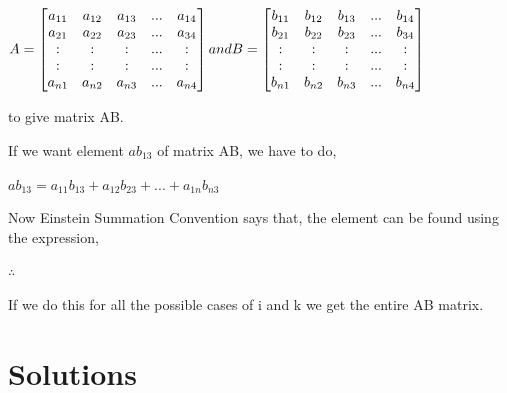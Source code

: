 \documentclass[a4paper,12pt]{article}
\begin{document}
\begin{flushleft}
\begin{flushleft}
\begin{flushleft}
$A = \begin{bmatrix}
a_{11} & a_{12} & a_{13} & ... & a_{14}\\
a_{21} & a_{22} & a_{23} & ... & a_{34}\\
: & : & : & ... & :\\
: & : & : & ... & :\\
a_{n1} & a_{n2} & a_{n3} & ... & a_{n4}
\end{bmatrix} and  B = \begin{bmatrix}
b_{11} & b_{12} & b_{13} & ... & b_{14}\\
b_{21} & b_{22} & b_{23} & ... & b_{34}\\
: & : & : & ... & :\\
: & : & : & ... & :\\
b_{n1} & b_{n2} & b_{n3} & ... & b_{n4}
\newline
\end{bmatrix}$

to give matrix AB.

If we want element $ab_{13}$ of matrix AB, we have to do,

$ab_{13} = a_{11}b_{13} + a_{12}b_{23} + ... + a_{1n}b_{n3}$
\newline

Now Einstein Summation Convention says that, the element can be found using the expression,
\newline

$\therefore$ 
\newline

If we do this for all the possible cases of i and k we get the entire AB matrix.
\end{flushleft}





\newpage
\section{Solutions}
\begin{flushleft}
\end{flushleft}
\end{flushleft}
\end{flushleft}
\end{document}
